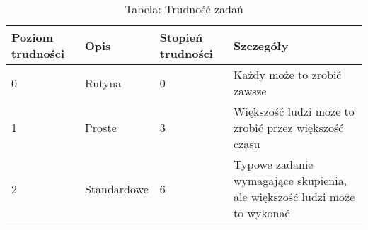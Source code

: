 \begin{table*}[t]
 \centering
 \begin{tabularx}{\textwidth}{ | X | X | X | X |}
  \hline
   Poziom trudności & Opis & Stopień trudności & Szczegóły  \\ \hline
    0 & Rutyna & 0 & Każdy może to zrobić zawsze \\ \hline
    1 & Proste & 3 & Większość ludzi może to zrobić przez większość czasu  \\ \hline
    2 & Standardowe & 6 & Typowe zadanie wymagające skupienia, ale większość ludzi może to wykonać \\ \hline
 \end{tabularx}
  \caption {Tabela: Trudność zadań}
  \label {Tabela: Trudność zadań}
 \end{table*}